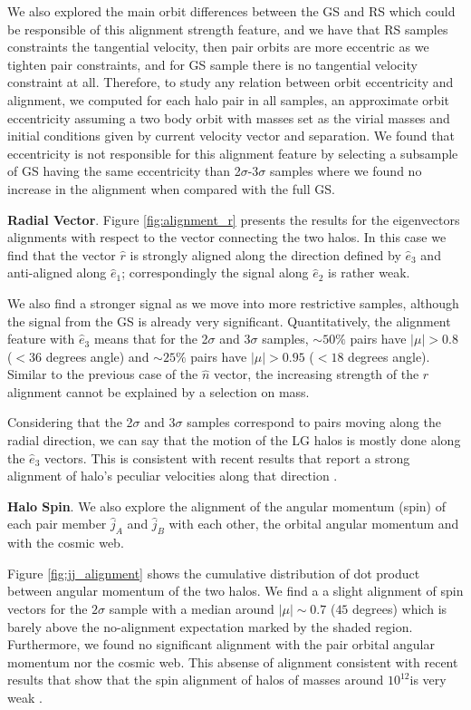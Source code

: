 \documentclass{emulateapj}
\newcommand{\Msun}{{\ifmmode{{\rm {M_{\odot}}}}\else{${\rm{M_{\odot}}}$}\fi}}
\begin{document}
We also explored the main orbit differences between the GS and RS  which could be
responsible of this alignment strength feature, and we have that RS samples constraints
the tangential velocity, then pair orbits are more eccentric as we tighten pair
constraints, and for GS sample there is no tangential velocity constraint at all.
Therefore, to study any relation between orbit eccentricity and alignment, we 
computed for each halo pair in all samples, an approximate orbit 
eccentricity assuming a two body orbit with masses set as the virial 
masses and initial conditions given by current velocity vector and separation.
We found that eccentricity is not responsible for this alignment feature by
selecting a subsample of GS having the same eccentricity than 
2$\sigma$-3$\sigma$ samples where we found no increase in the alignment when
compared with the full GS. 


{\bf Radial Vector}.  Figure \ref{fig:alignment_r} presents the
results for the eigenvectors alignments with respect to the vector
connecting the two halos. 
In this case we find that the vector $\hat{r}$
is strongly aligned along the direction defined by
$\hat{e}_3$ and anti-aligned along $\hat{e}_1$; correspondingly the
signal along $\hat{e}_2$ is rather weak. 

We also find a stronger signal as we move into more restrictive
samples, although the signal from the GS is already very
significant. 
Quantitatively, the alignment feature with $\hat{e}_3$
means that for the 2$\sigma$ and 3$\sigma$ samples, $\sim 50\%$ pairs
have $|\mu|>0.8$ ($<36$ degrees angle) and $\sim 25\%$ pairs have
$|\mu|>0.95$ ($<18$ degrees angle). Similar to the previous case of
the $\hat{n}$ vector, the increasing strength of the
$\hat{r}$ alignment cannot be explained by a selection on mass. 

Considering that the 2$\sigma$ and 3$\sigma$ samples correspond to
pairs moving along the radial direction, we can say that the
motion of the LG halos is mostly done along the $\hat{e}_3$
vectors. This is consistent with recent results that report a strong
alignment of halo's peculiar velocities along that direction
\citep{ForeroRomero2014}. 

{\bf Halo Spin}. We also explore the alignment of the  angular
momentum (spin) of each pair member $\hat{j}_A$ and $\hat{j}_B$ with
each other, the orbital angular momentum and with the cosmic web. 

Figure \ref{fig:jj_alignment} shows the cumulative distribution of dot
product between angular momentum of the  two halos. We find a a slight
alignment of spin vectors for the $2\sigma$ sample with a median around
$|\mu|\sim 0.7$ ($45$ degrees) which is barely above the no-alignment expectation marked by the shaded region. Furthermore, we found no significant
alignment with the pair orbital angular momentum nor the cosmic web. This
absense of alignment consistent with recent results that show that the spin
alignment of halos of masses around $10^{12}$\Msun is very weak
\citep{ForeroRomero2014}. 
 
\end{document}
